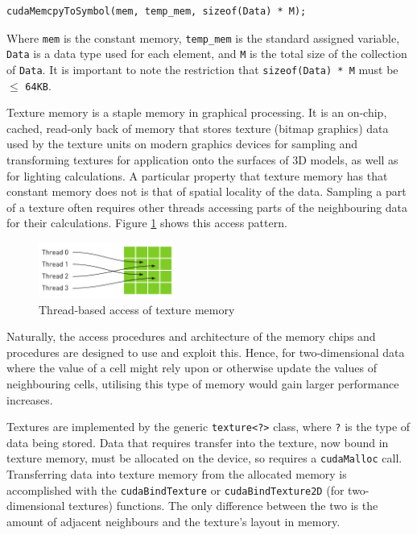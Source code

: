 \documentclass[conference]{IEEEtran}
\begin{document}
\begin{lstlisting}[breaklines]
cudaMemcpyToSymbol(mem, temp_mem, sizeof(Data) * M);
\end{lstlisting}

Where \texttt{mem} is the constant memory, \texttt{temp\_mem} is the standard assigned variable, \texttt{Data} is a data type used for each element, and \texttt{M} is the total size of the collection of \texttt{Data}. It is important to note the restriction that \texttt{sizeof(Data) * M} must be $\leq$ \texttt{64KB}.

Texture memory is a staple memory in graphical processing. It is an on-chip, cached, read-only back of memory that stores texture (bitmap graphics) data used by the texture units on modern graphics devices for sampling and transforming textures for application onto the surfaces of 3D models, as well as for lighting calculations. A particular property that texture memory has that constant memory does not is that of spatial locality of the data. Sampling a part of a texture often requires other threads accessing parts of the neighbouring data for their calculations. Figure \ref{fig:texmem} shows this access pattern.

\begin{figure}[H]
    \centering
    \includegraphics[width=0.4\textwidth]{images/TextureMemory.png}
    \caption{Thread-based access of texture memory}
    \label{fig:texmem}
\end{figure}

Naturally, the access procedures and architecture of the memory chips and procedures are designed to use and exploit this. Hence, for two-dimensional data where the value of a cell might rely upon or otherwise update the values of neighbouring cells, utilising this type of memory would gain larger performance increases.

Textures are implemented by the generic \texttt{texture<?>} class, where \texttt{?} is the type of data being stored. Data that requires transfer into the texture, now bound in texture memory, must be allocated on the device, so requires a \texttt{cudaMalloc} call. Transferring data into texture memory from the allocated memory is accomplished with the \texttt{cudaBindTexture} or \texttt{cudaBindTexture2D} (for two-dimensional textures) functions. The only difference between the two is the amount of adjacent neighbours and the texture's layout in memory\cite{wilt2013cuda}.
\end{document}
